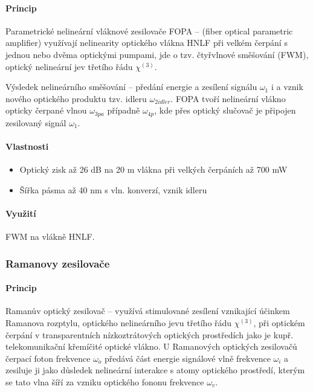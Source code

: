 \documentclass[a4paper, 12pt]{article}
\begin{document}
                \paragraph{Princip}
                Parametrické nelineární vláknové zesilovače FOPA -- (fiber optical parametric amplifier)
                využívají nelinearity optického vlákna HNLF při velkém čerpání s jednou nebo dvěma optickými
                pumpami, jde o tzv. čtyřvlnové směšování (FWM), optický nelineární jev třetího řádu $\chi^{(3)}$.

                Výsledek nelineárního směšování -- předání energie a zesílení signálu $\omega_1$ i a vznik nového
                optického produktu tzv. idleru $\omega_{2idler}$. FOPA tvoří nelineární vlákno opticky čerpané vlnou
                $\omega_{3pa}$ případně $\omega_{4p}$, kde přes optický slučovač je připojen zesilovaný signál $\omega_1$.

                \paragraph{Vlastnosti}
                \begin{itemize}
                    \item Optický zisk až 26 dB na 20 m vlákna při velkých čerpáních až 700 mW
                    \item Šířka pásma až 40 nm s vln. konverzí, vznik idleru
                \end{itemize}

                \paragraph{Využití}
                FWM na vlákně HNLF.

            \subsubsection{Ramanovy zesilovače}
                \paragraph{Princip}
                Ramanův optický zesilovač -- využívá stimulované zesílení vznikající účinkem Ramanova rozptylu,
                optického nelineárního jevu třetího řádu $\chi^{(3)}$, při optickém čerpání v transparentních
                nízkoztrátových optických prostředích jako je kupř. telekomunikační křemíčité optické vlákno.
                U Ramanových optických zesilovačů čerpací foton frekvence $\omega_o$ předává část energie
                signálové vlně frekvence $\omega_i$ a zesiluje ji jako důsledek nelineární interakce s atomy
                optického prostředí, kterým se tato vlna šíří za vzniku optického fononu frekvence $\omega_v$.
\end{document}
